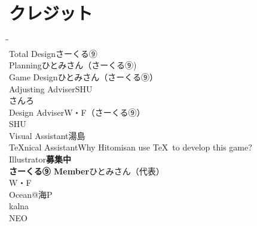 \documentclass[line_length=22zw,number_of_lines=45,twocolumn]{jlreq}
\newcommand{\hmemph}[1]{\textbf{#1}}
\begin{document}
\onecolumn
\section{クレジット}
\begin{tabbing}
	\hspace{15\zw}\=\hspace{10\zw}\=\kill\\
	Total Design\>さーくる⑨\\
	Planning\>ひとみさん（さーくる⑨)\\
	Game Design\>ひとみさん（さーくる⑨）\\
	Adjusting Adviser\>SHU\\
	\>さんろ\\
	Design Adviser\>W・F（さーくる⑨）\\
	\>SHU\\
	Visual Assistant\>湯島\\
	\TeX nical Assistant\>Why Hitomisan use \TeX\ to develop this game?\\
	Illustrator\>\hmemph{募集中}\\
	\hmemph{さーくる⑨ Member}\>ひとみさん（代表）\\
	\>W・F\\
	\>Ocean@海P\\
	\>kalna\\
	\>NEO\\
\end{tabbing}

\doclicenseThis
\end{document}
